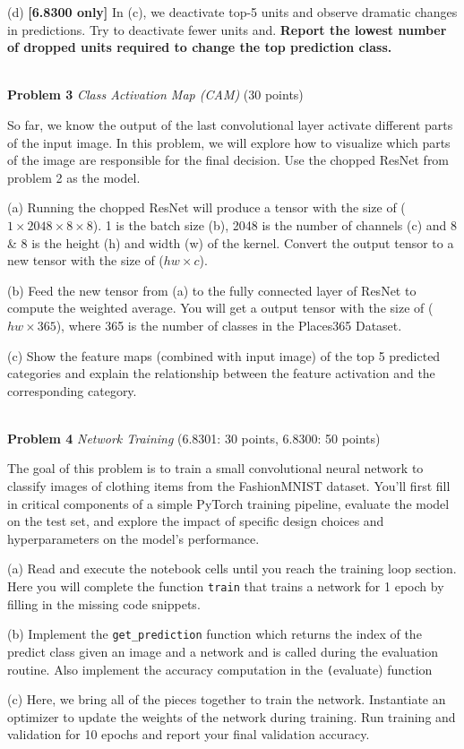 \documentclass[11pt]{article}
\newcommand{\hwproblem}[2] {\noindent \\ {\bf #1} {\it #2}}
\begin{document}
(d) \textbf{[6.8300 only]}  In (c), we deactivate top-5 units and observe dramatic changes in predictions. Try to deactivate fewer units and. \textbf{Report the lowest number of dropped units required to change the top prediction class.}


\hwproblem{Problem 3}{Class Activation Map (CAM)} (30 points)

So far, we know the output of the last convolutional layer activate different parts of the input image. In this problem, we will explore how to visualize which parts of the image are responsible for the final decision. Use the chopped ResNet from problem 2 as the model. 

(a) Running the chopped ResNet will produce a tensor with the size of ($1 \times 2048 \times 8 \times 8$). 1 is the batch size (b), 2048 is the number of channels (c) and 8 \& 8 is the height (h) and width (w) of the kernel. Convert the output tensor to a new tensor with the size of ($hw \times c$). 

(b) Feed the new tensor from (a) to the fully connected layer of ResNet to compute the weighted average. You will get a output tensor with the size of ($hw \times 365$), where 365 is the number of classes in the Places365 Dataset. 

(c) Show the feature maps (combined with input image) of the top 5 predicted categories and explain the relationship between the feature activation and the corresponding category. 

\hwproblem{Problem 4}{Network Training} (6.8301: 30 points, 6.8300: 50 points)

The goal of this problem is to train a small convolutional neural network to classify images of clothing items from the FashionMNIST dataset. You'll first fill in critical components of a simple PyTorch training pipeline, evaluate the model on the test set, and explore the impact of specific design choices and hyperparameters on the model's performance.

(a) Read and execute the notebook cells until you reach the training loop section. Here you will complete the function \texttt{train} that trains a network for 1 epoch by filling in the missing code snippets. 

(b) Implement the \texttt{get\_prediction} function which returns the index of the predict class given an image and a network and is called during the evaluation routine. Also implement the accuracy computation in the \texttt(evaluate) function

(c) Here, we bring all of the pieces together to train the network. Instantiate an optimizer to update the weights of the network during training. Run training and validation for 10 epochs and report your final validation accuracy.
\end{document}
